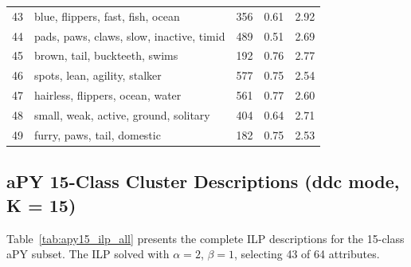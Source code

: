 \begin{table}[H]
\begin{tabular}{clccc}
        43 & blue, flippers, fast, fish, ocean & 356 & 0.61 & 2.92 \\
        44 & pads, paws, claws, slow, inactive, timid & 489 & 0.51 & 2.69 \\
        45 & brown, tail, buckteeth, swims & 192 & 0.76 & 2.77 \\
        46 & spots, lean, agility, stalker & 577 & 0.75 & 2.54 \\
        47 & hairless, flippers, ocean, water & 561 & 0.77 & 2.60 \\
        48 & small, weak, active, ground, solitary & 404 & 0.64 & 2.71 \\
        49 & furry, paws, tail, domestic & 182 & 0.75 & 2.53 \\
        \bottomrule
    \end{tabular}
\end{table}



\subsection{aPY 15-Class Cluster Descriptions (ddc mode, K = 15)}

Table~\ref{tab:apy15_ilp_all} presents the complete ILP descriptions for the 15-class aPY subset. The ILP solved with $\alpha = 2$, $\beta = 1$, selecting 43 of 64 attributes.


